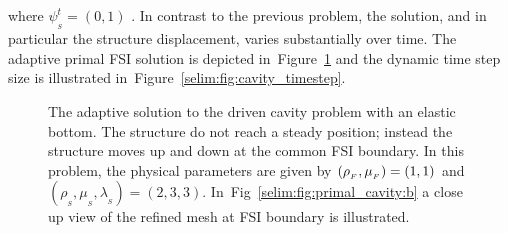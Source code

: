 where $\psi^t_{_{S}}=(0,1)$ . In contrast to the
previous problem, the solution, and in particular the structure
displacement, varies substantially over time. The adaptive primal FSI
solution is depicted in~Figure~\ref{selim:fig:primal_cavity} and the
dynamic time step size is illustrated
in~Figure~\ref{selim:fig:cavity_timestep}.
\begin{figure}
\label{selim:fig:primal_cavity}
\caption{The adaptive solution to the driven cavity problem with an
  elastic bottom. The structure do not reach a steady position;
  instead the structure moves up and down at the common FSI
  boundary. In this problem, the physical parameters are given by
  $(\rho_{_{F}},\mu_{_{F}}) = (1, 1)$ and $(\rho_{_{S}},\mu_{_{S}},
  \lambda_{_{S}}) = (2, 3, 3)$. In~Fig~\ref{selim:fig:primal_cavity:b}
  a close up view of the refined mesh at FSI boundary is illustrated.}
\end{figure}


